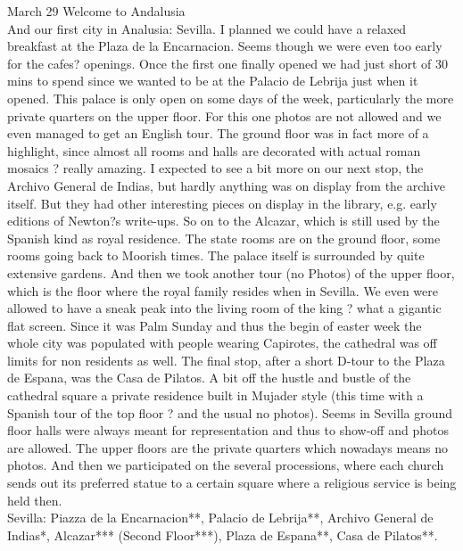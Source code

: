 March 29 Welcome to Andalusia\\
And our first city in Analusia: Sevilla. I planned we could have a relaxed breakfast at the  Plaza de la Encarnacion. Seems though we were even too early for the cafes? openings. Once the first one finally opened we had just short of 30 mins to spend since we wanted to be at the Palacio de Lebrija just when it opened. This palace is only open on some days of the week, particularly the more private quarters on the upper floor. For this one photos are not allowed and we even managed to get an English tour. The ground floor was in fact more of a highlight, since almost all rooms and halls are decorated with actual roman mosaics ? really amazing. I expected to see a bit more on our next stop, the Archivo General de Indias, but hardly anything was on display from the archive itself. But they had other interesting pieces on display in the library, e.g. early editions of Newton?s write-ups. So on to the Alcazar, which is still used by the Spanish kind as royal residence. The state rooms are on the ground floor, some rooms going back to Moorish times. The palace itself is surrounded by quite extensive gardens. And then we took another tour (no Photos) of the upper floor, which is the floor where the royal family resides when in Sevilla. We even were allowed to have a sneak peak into the living room of the king ? what a gigantic flat screen. Since it was Palm Sunday and thus the begin of easter week the whole city was populated with people wearing Capirotes, the cathedral was off limits for non residents as well. The final stop, after a short D-tour to the Plaza de Espana, was the Casa de Pilatos. A bit off the hustle and bustle of the cathedral square a private residence built in Mujader style (this time with a Spanish tour of the top floor ? and the usual no photos). Seems in Sevilla ground floor halls were always meant for representation and thus to show-off and photos are allowed. The upper floors are the private quarters which nowadays means no photos. And then we participated on the several processions, where each church sends out its preferred statue to a certain square where a religious service is being held then.\\

Sevilla:
Piazza de la Encarnacion**,
Palacio de Lebrija**,
Archivo General de Indias*,
Alcazar*** (Second Floor***),
Plaza de Espana**,
Casa de Pilatos**.\\

